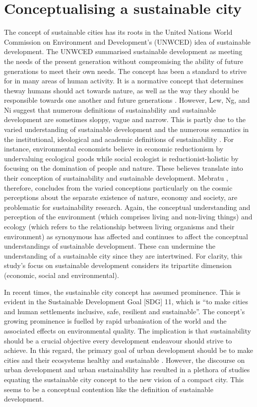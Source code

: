 \section{Conceptualising a sustainable city}

The concept of sustainable cities has its roots in the United Nations World Commission on Environment and Development's (UNWCED) idea of sustainable development. The UNWCED summarised sustainable development as meeting the needs of the present generation without compromising the ability of future generations to meet their own needs. The concept has been a standard to strive for in many areas of human activity. It is a normative concept that determines theway humans should act towards nature, as well as the way they should be responsible towards one another and future generations \cite{Yigitcanlar2015}. However, Lew, Ng, and Ni \cite{Lew2016} suggest that numerous definitions of sustainability and sustainable development are sometimes sloppy, vague and narrow. This is partly due to the varied understanding of sustainable development and the numerous semantics in the institutional, ideological and academic definitions of sustainability \cite{Mebratu1998}. For instance, environmental economists believe in economic reductionism by undervaluing ecological goods while social ecologist is reductionist-holistic by focusing on the domination of people and nature. These believes translate into their conception of sustainability and sustainable development. Mebratu \cite{Mebratu1998}, therefore, concludes from the varied conceptions particularly on the cosmic perceptions about the separate existence of nature, economy and society, are problematic for sustainability research. Again, the conceptual understanding and perception of the environment (which comprises living and non-living things) and ecology (which refers to the relationship between living organisms and their environment) as synonymous has affected and continues to affect the conceptual understandings of sustainable development. These can undermine the understanding of a sustainable city since they are intertwined. For clarity, this study's focus on sustainable development considers its tripartite dimension (economic, social and environmental).

In recent times, the sustainable city concept has assumed prominence. This is evident in the Sustainable Development Goal [SDG] 11, which is “to make cities and human settlements inclusive, safe, resilient and sustainable”. The concept's growing prominence is fuelled by rapid urbanisation of the world and the associated effects on environmental quality. The implication is that sustainability should be a crucial objective every development endeavour should strive to achieve. In this regard, the primary goal of urban development should be to make cities and their ecosystems healthy and sustainable \cite{Hiremath2013}. However, the discourse on urban development and urban sustainability has resulted in a plethora of studies equating the sustainable city concept to the new vision of a compact city. This seems to be a conceptual contention like the definition of sustainable development.

